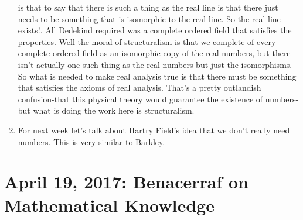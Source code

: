 \documentclass[12pt]{article}
\theoremstyle{definition}
\begin{document}
\begin{enumerate}
        is that to say that there is such a thing as the real line is that
        there just needs to be something that is isomorphic to the real line.
        So the real line exists!. All Dedekind required was a complete ordered
        field that satisfies the properties. Well the moral of structuralism is
        that we complete of every complete ordered field as an isomorphic copy
        of the real numbers, but there isn't actually one such thing as the
        real numbers but just the isomorphisms. So what is needed to make real
        analysis true is that there must be something that satisfies the axioms
        of real analysis. That's a pretty outlandish confusion-that this
        physical theory would guarantee the existence of numbers-but what is
        doing the work here is structuralism.
    \item
        For next week let's talk about Hartry Field's idea that we don't really
        need numbers. This is very similar to Barkley.

\end{enumerate}

\section{April 19, 2017: Benacerraf on Mathematical Knowledge}
\end{document}
